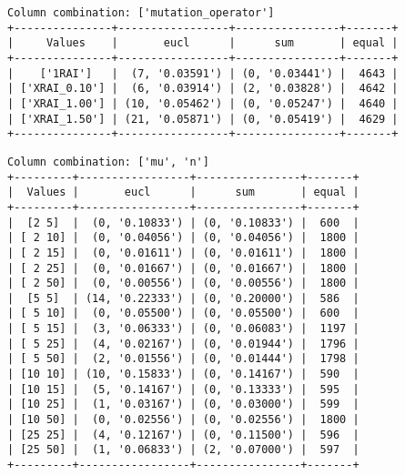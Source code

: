 \documentclass{article}
\begin{document}
\begin{verbatim}
Column combination: ['mutation_operator']
+---------------+-----------------+----------------+-------+
|     Values    |       eucl      |      sum       | equal |
+---------------+-----------------+----------------+-------+
|    ['1RAI']   |  (7, '0.03591') | (0, '0.03441') |  4643 |
| ['XRAI_0.10'] |  (6, '0.03914') | (2, '0.03828') |  4642 |
| ['XRAI_1.00'] | (10, '0.05462') | (0, '0.05247') |  4640 |
| ['XRAI_1.50'] | (21, '0.05871') | (0, '0.05419') |  4629 |
+---------------+-----------------+----------------+-------+
\end{verbatim}

\begin{verbatim}
Column combination: ['mu', 'n']
+---------+-----------------+----------------+-------+
|  Values |       eucl      |      sum       | equal |
+---------+-----------------+----------------+-------+
|  [2 5]  |  (0, '0.10833') | (0, '0.10833') |  600  |
| [ 2 10] |  (0, '0.04056') | (0, '0.04056') |  1800 |
| [ 2 15] |  (0, '0.01611') | (0, '0.01611') |  1800 |
| [ 2 25] |  (0, '0.01667') | (0, '0.01667') |  1800 |
| [ 2 50] |  (0, '0.00556') | (0, '0.00556') |  1800 |
|  [5 5]  | (14, '0.22333') | (0, '0.20000') |  586  |
| [ 5 10] |  (0, '0.05500') | (0, '0.05500') |  600  |
| [ 5 15] |  (3, '0.06333') | (0, '0.06083') |  1197 |
| [ 5 25] |  (4, '0.02167') | (0, '0.01944') |  1796 |
| [ 5 50] |  (2, '0.01556') | (0, '0.01444') |  1798 |
| [10 10] | (10, '0.15833') | (0, '0.14167') |  590  |
| [10 15] |  (5, '0.14167') | (0, '0.13333') |  595  |
| [10 25] |  (1, '0.03167') | (0, '0.03000') |  599  |
| [10 50] |  (0, '0.02556') | (0, '0.02556') |  1800 |
| [25 25] |  (4, '0.12167') | (0, '0.11500') |  596  |
| [25 50] |  (1, '0.06833') | (2, '0.07000') |  597  |
+---------+-----------------+----------------+-------+
\end{verbatim}
\end{document}
